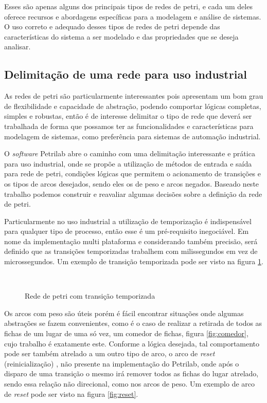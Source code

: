 Esses são apenas alguns dos principais tipos de redes de petri, e cada um deles oferece recursos e abordagens específicas para a modelagem e análise de sistemas. O uso correto e adequado desses tipos de redes de petri depende das características do sistema a ser modelado e das propriedades que se deseja analisar. 

\subsection{Delimitação de uma rede para uso industrial}

As redes de petri são particularmente interessantes pois apresentam um bom grau de flexibilidade e capacidade de abstração, podendo comportar lógicas completas, simples e robustas, então é de interesse delimitar o tipo de rede que deverá ser trabalhada de forma que possamos ter as funcionalidades e características para modelagem de sistemas, como preferência para sistemas de automação industrial. 

O \textit{software} Petrilab \cite{de2015petrilab} abre o caminho com uma delimitação interessante e prática para uso industrial, onde se propõe a utilização de métodos de entrada e saída para rede de petri, condições lógicas que permitem o acionamento de transições e os tipos de arcos desejados, sendo eles os de peso e arcos negados. Baseado neste trabalho podemos construir e reavaliar algumas decisões sobre a definição da rede de petri. 

Particularmente no uso industrial a utilização de temporização é indispensável para qualquer tipo de processo, então esse é um pré-requisito inegociável. Em nome da implementação multi plataforma e considerando também precisão, será definido que as transições temporizadas trabalhem com milissegundos em vez de microssegundos. Um exemplo de transição temporizada pode ser visto na figura \ref{fig:petritime}. 

\begin{figure}[ht]
	\centering
	\caption{Rede de petri com transição temporizada}
	\\
	\label{fig:petritime}
\end{figure}

Os arcos com peso são úteis porém é fácil encontrar situações onde algumas abstrações se fazem convenientes, como é o caso de realizar a retirada de todos as fichas de um lugar de uma só vez, um comedor de fichas, figura \ref{fig:comedor}, cujo trabalho é exatamente este. Conforme a lógica desejada, tal comportamento pode ser também atrelado a um outro tipo de arco, o arco de \textit{reset} (reinicialização) \cite{ResetNetsBetweenDecidabilityAndUndecidability}, não presente na implementação do Petrilab, onde após o disparo de uma transição o mesmo irá remover todos as fichas do lugar atrelado, sendo essa relação não direcional, como nos arcos de peso. Um exemplo de arco de \textit{reset} pode ser visto na figura \ref{fig:reset}. 

